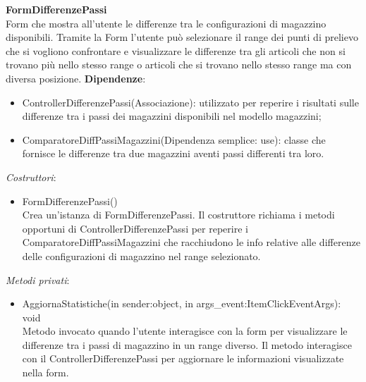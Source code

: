\textbf{FormDifferenzePassi}\\
Form che mostra all'utente le differenze tra le configurazioni di magazzino disponibili.
Tramite la Form l'utente può selezionare il range dei punti di prelievo che si vogliono confrontare e visualizzare
le differenze tra gli articoli che non si trovano più nello stesso range o articoli che si trovano nello stesso range ma con 
diversa posizione.
\textbf{Dipendenze}:
\begin{itemize}
    \item ControllerDifferenzePassi(Associazione): utilizzato per reperire i risultati sulle differenze tra i passi dei magazzini disponibili nel modello magazzini;\\
    \item ComparatoreDiffPassiMagazzini(Dipendenza semplice: use): classe che fornisce le differenze tra due magazzini aventi passi differenti tra loro.\\
\end{itemize}
\textit{Costruttori}:\\
\begin{itemize}
    \item FormDifferenzePassi()\\
    Crea un'istanza di FormDifferenzePassi. Il costruttore richiama i metodi opportuni di ControllerDifferenzePassi per reperire i 
    ComparatoreDiffPassiMagazzini che racchiudono le info relative alle differenze delle configurazioni di magazzino nel range selezionato.
\end{itemize}
\textit{Metodi privati}:\\
\begin{itemize}
    \item AggiornaStatistiche(in sender:object, in args\_event:ItemClickEventArgs): void\\
    Metodo invocato quando l'utente interagisce con la form per visualizzare le differenze tra i passi di magazzino in un range diverso.
    Il metodo interagisce con il ControllerDifferenzePassi per aggiornare le informazioni visualizzate nella form.\\
\end{itemize} 

